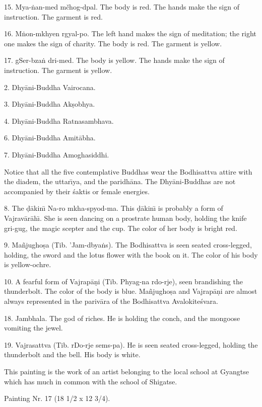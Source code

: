 \documentclass[a4paper, 12pt, oneside]{article}
\begin{document}
15. Mya-\.{n}an-med mčhog-dpal. The body is red. The hands make the sign of instruction. The garment is red.

16. M\.{n}on-mkhyen rgyal-po. The left hand makes the sign of meditation; the right one makes the sign of charity. The body is red. The garment is yellow.

17. gSer-bza\.{n} dri-med. The body is yellow. The hands make the sign of instruction. The garment is yellow.

2. Dhy\={a}ni-Buddha Vairocana.

3. Dhy\={a}ni-Buddha Ak\d{s}obhya.

4. Dhy\={a}ni-Buddha Ratnasambhava.

6. Dhy\={a}ni-Buddha Amit\={a}bha.

7. Dhy\={a}ni-Buddha Amoghasiddhi.

Notice that all the five contemplative Buddhas wear the Bodhisattva attire with the diadem, the uttar\={\i}ya, and the paridh\={a}na. The Dhy\={a}ni-Buddhas are not accompanied by their \'{s}aktis or female energies.

8. The \d{d}\={a}kin\={\i} Na-ro mkha-spyod-ma. This \d{d}\={a}kin\={\i} is probably a form of Vajrav\={a}r\={a}h\={\i}. She is seen dancing on a prostrate human body, holding the knife gri-gug, the magic scepter and the cup. The color of her body is bright red.

9. Ma\~{n}jugho\d{s}a (Tib. 'Jam-dbya\.{n}s). The Bodhisattva is seen seated cross-legged, holding, the sword and the lotus flower with the book on it. The color of his body is yellow-ochre.

10. A fearful form of Vajrap\={a}\d{n}i (Tib. Phyag-na rdo-rje), seen brandishing the thunderbolt. The color of the body is blue. Ma\~{n}jugho\d{s}a and Vajrap\={a}\d{n}i are almost always represented in the pariv\={a}ra of the Bodhisattva Avalokite\'{s}vara.

18. Jambhala. The god of riches. He is holding the conch, and the mongoose vomiting the jewel.

19. Vajrasattva (Tib. rDo-rje sems-pa). He is seen seated cross-legged, holding the thunderbolt and the bell. His body is white.

This painting is the work of an artist belonging to the local school at Gyangtse which has much in common with the school of Shigatse.

\bigskip

Painting Nr. 17 (18 1/2 x 12 3/4).

\bigskip
\end{document}
